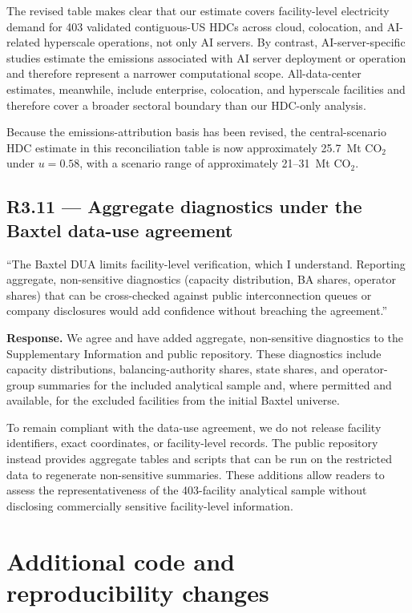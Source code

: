 \documentclass[11pt]{article}
\newenvironment{revquote}{%
  \begin{mdframed}[
    leftmargin=0.5em,
    rightmargin=0.5em,
    linewidth=0pt,
    backgroundcolor=gray!8,
    skipabove=0.5em,
    skipbelow=0.5em,
    innertopmargin=0.6em,
    innerbottommargin=0.6em,
    innerleftmargin=0.8em,
    innerrightmargin=0.8em
  ]%
  \itshape%
}{%
  \end{mdframed}%
}
\begin{document}
The revised table makes clear that our estimate covers facility-level electricity demand for 403 validated contiguous-US HDCs across cloud, colocation, and AI-related hyperscale operations, not only AI servers. By contrast, AI-server-specific studies estimate the emissions associated with AI server deployment or operation and therefore represent a narrower computational scope. All-data-center estimates, meanwhile, include enterprise, colocation, and hyperscale facilities and therefore cover a broader sectoral boundary than our HDC-only analysis.

Because the emissions-attribution basis has been revised, the central-scenario HDC estimate in this reconciliation table is now approximately 25.7~Mt CO$_2$ under $u=0.58$, with a scenario range of approximately 21--31~Mt CO$_2$.

\subsection*{R3.11 --- Aggregate diagnostics under the Baxtel data-use agreement}

\begin{revquote}
``The Baxtel DUA limits facility-level verification, which I understand. Reporting aggregate, non-sensitive diagnostics (capacity distribution, BA shares, operator shares) that can be cross-checked against public interconnection queues or company disclosures would add confidence without breaching the agreement.''
\end{revquote}

\textbf{Response.} We agree and have added aggregate, non-sensitive diagnostics to the Supplementary Information and public repository. These diagnostics include capacity distributions, balancing-authority shares, state shares, and operator-group summaries for the included analytical sample and, where permitted and available, for the excluded facilities from the initial Baxtel universe.

To remain compliant with the data-use agreement, we do not release facility identifiers, exact coordinates, or facility-level records. The public repository instead provides aggregate tables and scripts that can be run on the restricted data to regenerate non-sensitive summaries. These additions allow readers to assess the representativeness of the 403-facility analytical sample without disclosing commercially sensitive facility-level information.

\bigskip

\section*{Additional code and reproducibility changes}
\end{document}

